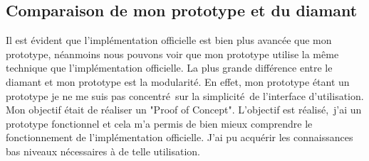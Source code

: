 \subsection{Comparaison de mon prototype et du diamant}

Il est évident que l'implémentation officielle est bien plus avancée que mon prototype,
néanmoins nous pouvons voir que mon prototype utilise la même technique que l'implémentation officielle.
La plus grande différence entre le diamant et mon prototype est la modularité. En effet, mon prototype étant
un prototype je ne me suis pas concentré sur la simplicité de l'interface d'utilisation. Mon objectif était 
de réaliser un "Proof of Concept". L'objectif est réalisé, j'ai un prototype fonctionnel et cela m'a permis 
de bien mieux comprendre le fonctionnement de l'implémentation officielle. J'ai pu acquérir les connaissances
bas niveaux nécessaires à de telle utilisation.
